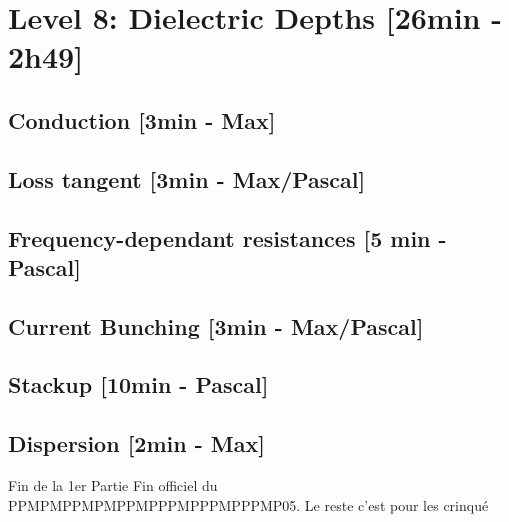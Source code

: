 

\section{Level 8: Dielectric Depths [26min - 2h49]}
\subsection{Conduction [3min - Max]}
\subsection{Loss tangent [3min - Max/Pascal]}
\subsection{Frequency-dependant resistances [5 min - Pascal]}
\subsection{Current Bunching [3min - Max/Pascal]}
\subsection{Stackup [10min - Pascal]}
\subsection{Dispersion [2min - Max]}

\begin{frame}{Fin de la 1er Partie}
    Fin officiel du PPMPMPPMPMPPMPPPMPPPMPPPMP05. Le reste c'est pour les crinqué
\end{frame}